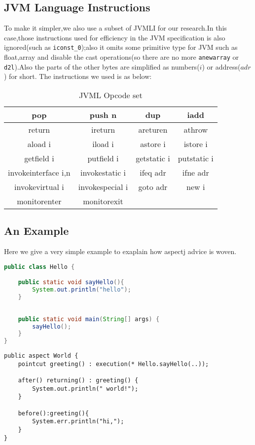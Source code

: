 \subsection{JVM Language Instructions}
To make it simpler,we also use a subset of JVMLI for our research.In this case,those instructions used for efficiency in the JVM specification is also ignored(such as \texttt{iconst\_0});also it omits some primitive type for JVM such as float,array and disable the cast operations(so there are no more \texttt{anewarray} or \texttt{d2l}).Also the parts of the other bytes are simplified as numbers($i$) or address($adr$) for short. The instructions we used is as below:
\begin{table}[hbt]
\centering
\begin{tabular}{cccc}
\hline\hline pop & push n & dup &iadd \\
\hline return & ireturn & areturen & athrow \\
\hline aload i & iload i & astore i&istore i \\
\hline getfield i& putfield i &getstatic i &  putstatic i\\
\hline invokeinterface i,n & invokestatic i & ifeq adr & ifne adr\\
\hline invokevirtual i & invokespecial i & goto adr  & new i \\
\hline monitorenter & monitorexit\\
\hline
\end{tabular}
\caption{JVML Opcode set}
\end{table}

\subsection{An Example}
Here we give a very simple example to exaplain how aspectj advice is woven.
\begin{multicols}{2}
\begin{lstlisting}[language=java,caption=original file Hello.java]
public class Hello {

	public static void sayHello(){
		System.out.println("hello");
	}
	
	
	public static void main(String[] args) {
		sayHello();
	}
}
\end{lstlisting}

\begin{lstlisting}[language=aspectj,caption=aspectj file World.aj]
public aspect World {
	pointcut greeting() : execution(* Hello.sayHello(..));

	after() returning() : greeting() {
		System.out.println(" world!");
	}
	
	before():greeting(){
		System.err.println("hi,");
	}
}
\end{lstlisting}
\end{multicols}


